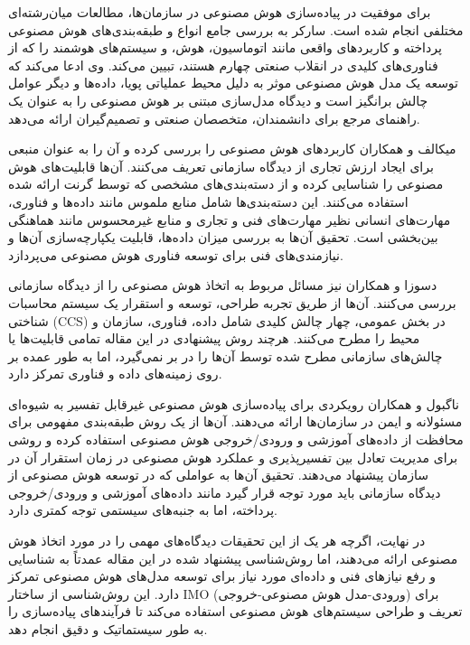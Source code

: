 \documentclass[a4paper,10pt]{article}
\begin{document}
            برای موفقیت در پیاده‌سازی هوش مصنوعی در سازمان‌ها، مطالعات میان‌رشته‌ای مختلفی انجام شده است. سارکر به بررسی جامع انواع و طبقه‌بندی‌های هوش مصنوعی پرداخته و کاربردهای واقعی مانند اتوماسیون، هوش، و سیستم‌های هوشمند را که از فناوری‌های کلیدی در انقلاب صنعتی چهارم هستند، تبیین می‌کند. وی ادعا می‌کند که توسعه یک مدل هوش مصنوعی موثر به دلیل محیط عملیاتی پویا، داده‌ها و دیگر عوامل چالش برانگیز است و دیدگاه مدل‌سازی مبتنی بر هوش مصنوعی را به عنوان یک راهنمای مرجع برای دانشمندان، متخصصان صنعتی و تصمیم‌گیران ارائه می‌دهد.

            میکالف و همکاران کاربردهای هوش مصنوعی را بررسی کرده و آن را به عنوان منبعی برای ایجاد ارزش تجاری از دیدگاه سازمانی تعریف می‌کنند. آن‌ها قابلیت‌های هوش مصنوعی را شناسایی کرده و از دسته‌بندی‌های مشخصی که توسط گرنت ارائه شده استفاده می‌کنند. این دسته‌بندی‌ها شامل منابع ملموس مانند داده‌ها و فناوری، مهارت‌های انسانی نظیر مهارت‌های فنی و تجاری و منابع غیرمحسوس مانند هماهنگی بین‌بخشی است. تحقیق آن‌ها به بررسی میزان داده‌ها، قابلیت یکپارچه‌سازی آن‌ها و نیازمندی‌های فنی برای توسعه فناوری هوش مصنوعی می‌پردازد.

            دسوزا و همکاران نیز مسائل مربوط به اتخاذ هوش مصنوعی را از دیدگاه سازمانی بررسی می‌کنند. آن‌ها از طریق تجربه طراحی، توسعه و استقرار یک سیستم محاسبات شناختی (CCS) در بخش عمومی، چهار چالش کلیدی شامل داده، فناوری، سازمان و محیط را مطرح می‌کنند. هرچند روش پیشنهادی در این مقاله تمامی قابلیت‌ها یا چالش‌های سازمانی مطرح شده توسط آن‌ها را در بر نمی‌گیرد، اما به طور عمده بر روی زمینه‌های داده و فناوری تمرکز دارد.

            ناگبول و همکاران رویکردی برای پیاده‌سازی هوش مصنوعی غیرقابل تفسیر به شیوه‌ای مسئولانه و ایمن در سازمان‌ها ارائه می‌دهند. آن‌ها از یک روش طبقه‌بندی مفهومی برای محافظت از داده‌های آموزشی و ورودی/خروجی هوش مصنوعی استفاده کرده و روشی برای مدیریت تعادل بین تفسیرپذیری و عملکرد هوش مصنوعی در زمان استقرار آن در سازمان پیشنهاد می‌دهند. تحقیق آن‌ها به عواملی که در توسعه هوش مصنوعی از دیدگاه سازمانی باید مورد توجه قرار گیرد مانند داده‌های آموزشی و ورودی/خروجی پرداخته، اما به جنبه‌های سیستمی توجه کمتری دارد.

            در نهایت، اگرچه هر یک از این تحقیقات دیدگاه‌های مهمی را در مورد اتخاذ هوش مصنوعی ارائه می‌دهند، اما روش‌شناسی پیشنهاد شده در این مقاله عمدتاً به شناسایی و رفع نیازهای فنی و داده‌ای مورد نیاز برای توسعه مدل‌های هوش مصنوعی تمرکز دارد. این روش‌شناسی از ساختار IMO (ورودی-مدل هوش مصنوعی-خروجی) برای تعریف و طراحی سیستم‌های هوش مصنوعی استفاده می‌کند تا فرآیندهای پیاده‌سازی را به طور سیستماتیک و دقیق انجام دهد.
\end{document}
